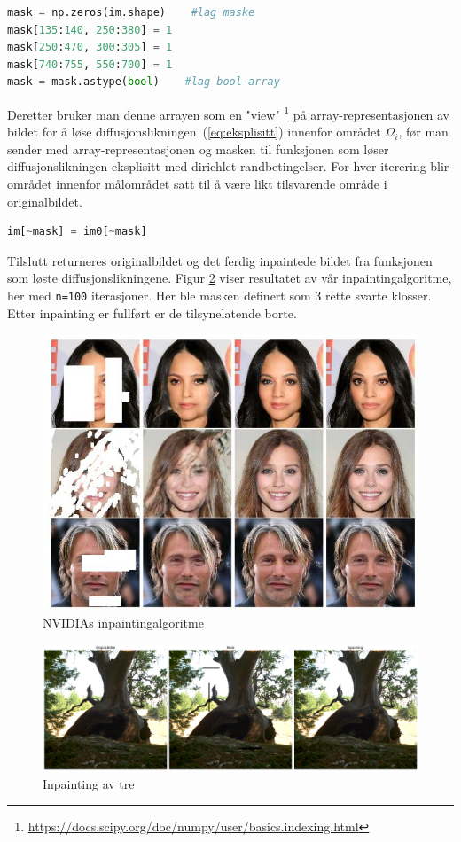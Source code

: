 \begin{lstlisting}[language=Python]
mask = np.zeros(im.shape)    #lag maske
mask[135:140, 250:380] = 1
mask[250:470, 300:305] = 1
mask[740:755, 550:700] = 1
mask = mask.astype(bool)    #lag bool-array
\end{lstlisting}
 
Deretter bruker man denne arrayen som en "view" \footnote{\url{https://docs.scipy.org/doc/numpy/user/basics.indexing.html}} på array-representasjonen av bildet for å løse diffusjonslikningen~(\ref{eq:eksplisitt}) innenfor området $\Omega_i$, før man sender med array-representasjonen og masken til funksjonen som løser diffusjonslikningen eksplisitt med dirichlet randbetingelser. For hver iterering blir området innenfor målområdet satt til å være likt tilsvarende område i originalbildet.
\begin{lstlisting}[language=Python]
    im[~mask] = im0[~mask]
\end{lstlisting}
Tilslutt returneres originalbildet og det ferdig inpaintede bildet fra funksjonen som løste diffusjonslikningene. Figur \ref{fig:inpaint} viser resultatet av vår inpaintingalgoritme, her med \texttt{n=100} iterasjoner. Her ble masken definert som 3 rette svarte klosser. Etter inpainting er fullført er de tilsynelatende borte. 
\begin{figure}
\begin{center}
    \includegraphics[width=0.6\columnwidth]{bilder/nvidia-image-inpainting-demo.jpg}
    \caption{NVIDIAs inpaintingalgoritme~ \label{fig:nvidia}}
\end{center}
\end{figure}

\begin{figure}
\begin{center}
    \includegraphics[width=1\columnwidth]{bilder/tree_inpaint.png}
    \caption{Inpainting av tre~ \label{fig:inpaint}}
\end{center}
\end{figure}
